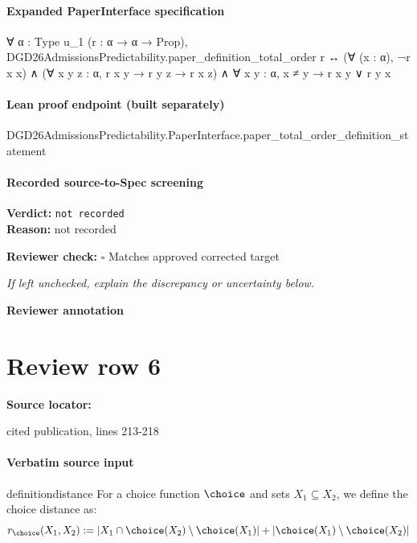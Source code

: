 \documentclass[10pt]{article}
\newcommand{\reviewerbox}{%
  \par\noindent\fbox{\parbox{0.96\linewidth}{\rule{0pt}{0.38in}}}\par
}
\newcommand{\reviewmatch}[1]{%
  \par\noindent\textbf{Reviewer check:} $\square$\; #1\par
  \noindent\emph{If left unchecked, explain the discrepancy or uncertainty below.}\par
}
\begin{document}
\paragraph{Expanded PaperInterface specification}
\begin{ReviewVerbatim}
∀ {α : Type u_1} (r : α → α → Prop),
  DGD26AdmissionsPredictability.paper_definition_total_order r ↔
    (∀ (x : α), ¬r x x) ∧ (∀ {x y z : α}, r x y → r y z → r x z) ∧ ∀ {x y : α}, x ≠ y → r x y ∨ r y x
\end{ReviewVerbatim}

\paragraph{Lean proof endpoint (built separately)}\begin{ReviewVerbatim}
DGD26AdmissionsPredictability.PaperInterface.paper_total_order_definition_statement
\end{ReviewVerbatim}

\paragraph{Recorded source-to-Spec screening}
\textbf{Verdict:} \texttt{not recorded}
\\
\textbf{Reason:} not recorded
\reviewmatch{Matches approved corrected target}
\noindent\textbf{Reviewer annotation}\par
\reviewerbox
\clearpage
\hypertarget{source-claim-a21144374ad8e28c}{}
\section*{Review row 6}
\textbf{Source locator:} {\footnotesize\raggedright cited publication, lines 213-\allowbreak{}218\par}
\paragraph{Verbatim source input}
\begin{ReviewVerbatim}
\begin{restatable}{definition}{distance} \label{def:distance}
For a choice function $\choice$ and sets $X_1 \subseteq X_2$, we define the choice distance as:
\begin{equation}
r_\choice(X_1, X_2) := |X_1 \cap \choice(X_2) \setminus \choice(X_1)| + |\choice(X_1) \setminus \choice(X_2)|
\end{equation}
\end{restatable}
\end{ReviewVerbatim}
\end{document}
